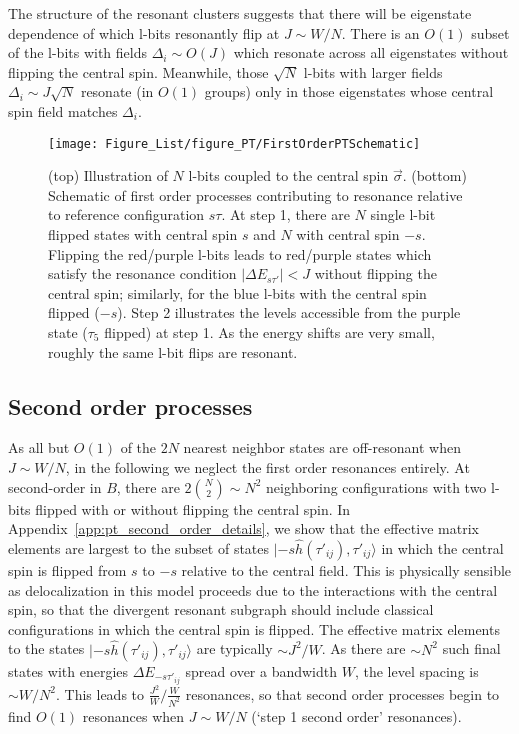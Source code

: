 \documentclass[aps,pra,twocolumn,a4paper,showpacs,superscriptaddress,floatfix,10pt]{revtex4}
\begin{document}
The structure of the resonant clusters suggests that there will be eigenstate dependence of which l-bits resonantly flip at $J \sim W/N$.
There is an $O(1)$ subset of the l-bits with fields $\Delta_i \sim O(J)$ which resonate across all eigenstates without flipping the central spin.
Meanwhile, those $\sqrt{N}$ l-bits with larger fields $\Delta_i \sim J \sqrt{N}$  resonate (in $O(1)$ groups) only in those eigenstates whose central spin field matches $\Delta_i$.


\begin{figure}[htb]
	\centering
	\texttt{[image: Figure\_List/figure\_PT/FirstOrderPTSchematic]}
	\caption{
	(top) Illustration of $N$ l-bits coupled to the central spin $\vec{\sigma}$.
	(bottom)
	Schematic of first order processes contributing to resonance relative to reference configuration $s \tau$.
	At step 1, there are $N$ single l-bit flipped states with central spin $s$ and $N$ with central spin $-s$. Flipping the red/purple l-bits leads to red/purple states which satisfy the resonance condition $|\Delta E_{s \tau'}| < J$ without flipping the central spin; similarly, for the blue l-bits with the central spin flipped ($-s$).
	Step 2 illustrates the levels accessible from the purple state ($\tau_5$ flipped) at step 1. As the energy shifts are very small, roughly the same l-bit flips are resonant.
	}
	\label{fig:firstorderschematic}
\end{figure}

\subsection{Second order processes} %
\label{sub:pt_second_order}

As all but $O(1)$ of the $2N$ nearest neighbor states are off-resonant when $J \sim W/N$, in the following we neglect the first order resonances entirely.
At second-order in $B$, there are $2\binom{N}{2} \sim N^2$ neighboring configurations with two l-bits flipped with or without flipping the central spin.
In Appendix~\ref{app:pt_second_order_details}, we show that the effective matrix elements are largest to the subset of states $|-s\hat{h}(\tau'_{ij}), \tau'_{ij}\rangle$ in which the central spin is flipped from $s$ to $-s$ relative to the central field.
This is physically sensible as delocalization in this model proceeds due to the interactions with the central spin, so that the divergent resonant subgraph should include classical configurations in which the central spin is flipped.
The effective matrix elements to the states $|-s\hat{h}(\tau'_{ij}), \tau'_{ij}\rangle$ are typically $\sim J^2/W$.
As there are $\sim N^2$ such final states with energies $\Delta E_{-s \tau'_{ij}}$ spread over a bandwidth $W$, the level spacing is $\sim W/N^2$.
This leads to $\frac{J^2}{W} / \frac{W}{N^2}$ resonances, so that second order processes begin to find $O(1)$ resonances when $J \sim W/N$ (`step 1 second order' resonances).
\end{document}
